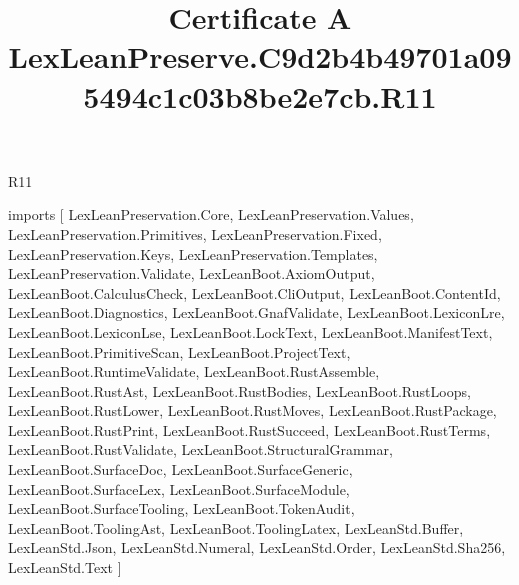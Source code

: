 \begin{lexlean}{R11}
\title{Certificate A LexLeanPreserve.C9d2b4b49701a095494c1c03b8be2e7cb.R11}
\begin{coremodule}
imports [
  LexLeanPreservation.Core,
  LexLeanPreservation.Values,
  LexLeanPreservation.Primitives,
  LexLeanPreservation.Fixed,
  LexLeanPreservation.Keys,
  LexLeanPreservation.Templates,
  LexLeanPreservation.Validate,
  LexLeanBoot.AxiomOutput,
  LexLeanBoot.CalculusCheck,
  LexLeanBoot.CliOutput,
  LexLeanBoot.ContentId,
  LexLeanBoot.Diagnostics,
  LexLeanBoot.GnafValidate,
  LexLeanBoot.LexiconLre,
  LexLeanBoot.LexiconLse,
  LexLeanBoot.LockText,
  LexLeanBoot.ManifestText,
  LexLeanBoot.PrimitiveScan,
  LexLeanBoot.ProjectText,
  LexLeanBoot.RuntimeValidate,
  LexLeanBoot.RustAssemble,
  LexLeanBoot.RustAst,
  LexLeanBoot.RustBodies,
  LexLeanBoot.RustLoops,
  LexLeanBoot.RustLower,
  LexLeanBoot.RustMoves,
  LexLeanBoot.RustPackage,
  LexLeanBoot.RustPrint,
  LexLeanBoot.RustSucceed,
  LexLeanBoot.RustTerms,
  LexLeanBoot.RustValidate,
  LexLeanBoot.StructuralGrammar,
  LexLeanBoot.SurfaceDoc,
  LexLeanBoot.SurfaceGeneric,
  LexLeanBoot.SurfaceLex,
  LexLeanBoot.SurfaceModule,
  LexLeanBoot.SurfaceTooling,
  LexLeanBoot.TokenAudit,
  LexLeanBoot.ToolingAst,
  LexLeanBoot.ToolingLatex,
  LexLeanStd.Buffer,
  LexLeanStd.Json,
  LexLeanStd.Numeral,
  LexLeanStd.Order,
  LexLeanStd.Sha256,
  LexLeanStd.Text
]


\end{coremodule}
\end{lexlean}

